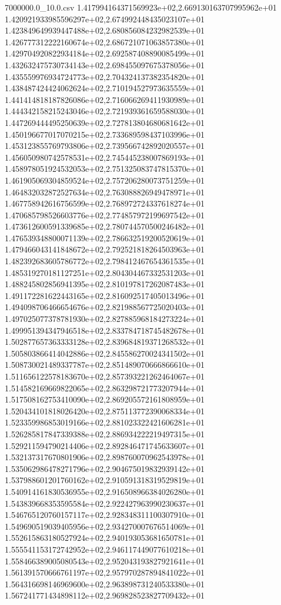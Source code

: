 \begin{filecontents*}{7000000.0_10.0.csv}
1.417994164371569923e+02,2.669130163707995962e+01
1.420921933985596297e+02,2.674992448435023107e+01
1.423849649939447488e+02,2.680856084232982539e+01
1.426777312222160674e+02,2.686721071063857380e+01
1.429704920822934184e+02,2.692587408890085499e+01
1.432632475730734143e+02,2.698455097675378056e+01
1.435559976934724773e+02,2.704324137382354820e+01
1.438487424424062624e+02,2.710194527973635559e+01
1.441414818187826086e+02,2.716066269411930989e+01
1.444342158215243046e+02,2.721939361659588030e+01
1.447269444495250639e+02,2.727813804680681642e+01
1.450196677017070215e+02,2.733689598437103996e+01
1.453123855769793806e+02,2.739566742892020557e+01
1.456050980742578531e+02,2.745445238007869193e+01
1.458978051924532053e+02,2.751325083747815370e+01
1.461905069304859524e+02,2.757206280073751259e+01
1.464832032872527634e+02,2.763088826949478971e+01
1.467758942616756599e+02,2.768972724337618274e+01
1.470685798526603776e+02,2.774857972199697542e+01
1.473612600591339685e+02,2.780744570500246482e+01
1.476539348800071139e+02,2.786632519200520619e+01
1.479466043141848672e+02,2.792521818264503963e+01
1.482392683605786772e+02,2.798412467654361535e+01
1.485319270181127251e+02,2.804304467332531203e+01
1.488245802856941395e+02,2.810197817262087483e+01
1.491172281622443165e+02,2.816092517405013496e+01
1.494098706466654676e+02,2.821988567725020403e+01
1.497025077378781930e+02,2.827885968184273224e+01
1.499951394347946518e+02,2.833784718745482678e+01
1.502877657363333128e+02,2.839684819371268532e+01
1.505803866414042886e+02,2.845586270024341502e+01
1.508730021489337787e+02,2.851489070666866610e+01
1.511656122578183670e+02,2.857393221262464067e+01
1.514582169669822065e+02,2.863298721773207944e+01
1.517508162753410090e+02,2.869205572161808959e+01
1.520434101818026420e+02,2.875113772390068334e+01
1.523359986853019166e+02,2.881023322421606281e+01
1.526285817847339388e+02,2.886934222219497315e+01
1.529211594790214406e+02,2.892846471745633607e+01
1.532137317670801906e+02,2.898760070962543978e+01
1.535062986478271796e+02,2.904675019832939142e+01
1.537988601201760162e+02,2.910591318319529819e+01
1.540914161830536955e+02,2.916508966384026280e+01
1.543839668353595584e+02,2.922427963990230637e+01
1.546765120760157117e+02,2.928348311100307910e+01
1.549690519039405956e+02,2.934270007676514069e+01
1.552615863180527924e+02,2.940193053681650781e+01
1.555541153172742952e+02,2.946117449077610218e+01
1.558466389005080543e+02,2.952043193827921641e+01
1.561391570666761197e+02,2.957970287894841022e+01
1.564316698146969600e+02,2.963898731240533380e+01
1.567241771434898112e+02,2.969828523827709432e+01

\end{filecontents*}
